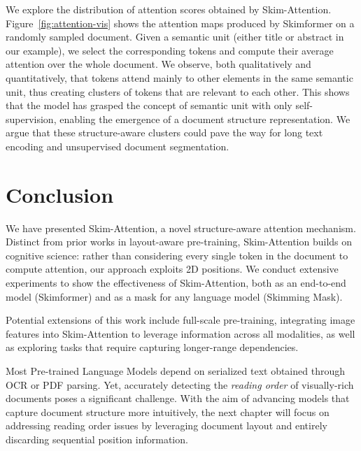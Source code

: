 We explore the distribution of attention scores obtained by Skim-Attention. Figure~\ref{fig:attention-vis} shows the attention maps produced by Skimformer on a randomly sampled document. Given a semantic unit (either title or abstract in our example), we select the corresponding tokens and compute their average attention over the whole document. We observe, both qualitatively and quantitatively, that tokens attend mainly to other elements in the same semantic unit, thus creating clusters of tokens that are relevant to each other. This shows that the model has grasped the concept of semantic unit with only self-supervision, enabling the emergence of a document structure representation. We argue that these structure-aware clusters could pave the way for long text encoding and unsupervised document segmentation.

\section{Conclusion}

We have presented Skim-Attention, a novel structure-aware attention mechanism. Distinct from prior works in layout-aware pre-training, Skim-Attention builds on cognitive science: rather than considering every single token in the document to compute attention, our approach exploits 2D positions. We conduct extensive experiments to show the effectiveness of Skim-Attention, both as an end-to-end model (Skimformer) and as a mask for any language model (Skimming Mask). 

Potential extensions of this work include full-scale pre-training, integrating image features into Skim-Attention to leverage information across all modalities, as well as exploring tasks that require capturing longer-range dependencies.

Most Pre-trained Language Models depend on serialized text obtained through \ac{OCR} or PDF parsing. Yet, accurately detecting the \textit{reading order} of visually-rich documents poses a significant challenge. With the aim of advancing models that capture document structure more intuitively, the next chapter will focus on addressing reading order issues by leveraging document layout and entirely discarding sequential position information.


